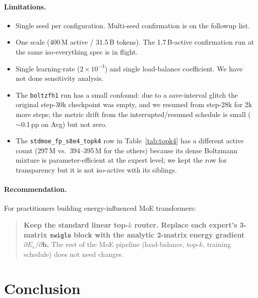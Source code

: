 \documentclass[oneside]{article}
\begin{document}
\paragraph{Limitations.}
\begin{itemize}[leftmargin=1.5em]
  \item Single seed per configuration. Multi-seed confirmation is on
        the followup list.
  \item One scale (400\,M active / 31.5\,B tokens). The 1.7\,B-active
        confirmation run at the same iso-everything spec is in flight.
  \item Single learning-rate ($2{\times}10^{-3}$) and single
        load-balance coefficient. We have not done sensitivity
        analysis.
  \item The \texttt{boltzfh1} run has a small confound: due to a
        save-interval glitch the original step-30k checkpoint was
        empty, and we resumed from step-28k for 2k more steps; the
        metric drift from the interrupted/resumed schedule is small
        ($\sim$0.1\,pp on Avg) but not zero.
  \item The \texttt{stdmoe\_fp\_s8e4\_topk4} row in
        Table~\ref{tab:topk4} has a different active count (297\,M
        vs.\ 394--395\,M for the others) because its dense Boltzmann
        mixture is parameter-efficient at the expert level; we kept
        the row for transparency but it is not iso-active with its
        siblings.
\end{itemize}

\paragraph{Recommendation.}
For practitioners building energy-influenced MoE transformers:

\begin{quote}
\textbf{Keep the standard linear top-$k$ router. Replace each
expert's 3-matrix \texttt{swiglu} block with the analytic 2-matrix
energy gradient $\partial E_e/\partial \mathbf{h}$.} The rest of the
MoE pipeline (load-balance, top-$k$, training schedule) does not need
changes.
\end{quote}

\section{Conclusion}
\end{document}
